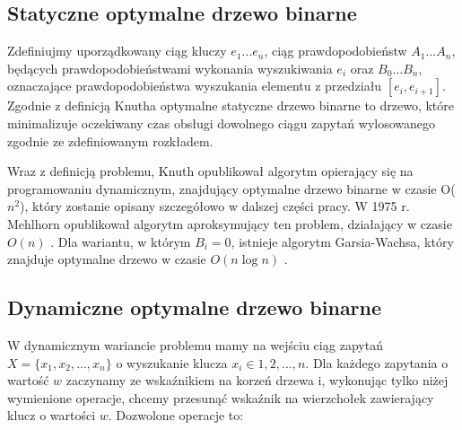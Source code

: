 \documentclass[declaration,shortabstract]{iithesis}
\theoremstyle{thm}
\theoremstyle{remark}
\theoremstyle{plain}
\theoremstyle{plain}
\theoremstyle{plain}
\begin{document}
\subsection{Statyczne optymalne drzewo binarne}   

Zdefiniujmy uporządkowany ciąg kluczy \(e_1...e_n\), ciąg prawdopodobieństw \(A_1...A_n\), będących prawdopodobieństwami wykonania wyszukiwania \(e_i\) oraz \(B_0 … B_n\), oznaczające prawdopodobieństwa wyszukania elementu z przedziału \([e_i, e_{i+1}]\). Zgodnie z definicją Knutha \cite{DBLP:journals/acta/Knuth71} optymalne statyczne drzewo binarne to drzewo, które minimalizuje oczekiwany czas obsługi dowolnego ciągu zapytań wylosowanego zgodnie ze zdefiniowanym rozkładem.    

Wraz z definicją problemu, Knuth opublikował algorytm opierający się na programowaniu dynamicznym, znajdujący optymalne drzewo binarne w czasie O(\(n^2\)), który zostanie opisany szczegółowo w dalszej części pracy. W 1975 r. Mehlhorn opublikował algorytm aproksymujący ten problem, działający w czasie \(O(n)\) \cite{DBLP:journals/acta/Mehlhorn75}. Dla wariantu, w którym \(B_i = 0\), istnieje algorytm Garsia-Wachsa, który znajduje optymalne drzewo w czasie \(O(n\log n)\) \cite{DBLP:journals/siamcomp/GarsiaW77}.   

\subsection{Dynamiczne optymalne drzewo binarne}   

W dynamicznym wariancie problemu \cite{DBLP:journals/siamcomp/DemaineHIP07} mamy na wejściu ciąg zapytań \(X  = \{x_1,x_2,..., x_n\}\) o wyszukanie klucza \(x_i \in {1, 2, ..., n}\). Dla każdego zapytania o wartość \(w\) zaczynamy ze wskaźnikiem na korzeń drzewa i, wykonując tylko niżej wymienione operacje, chcemy przesunąć wskaźnik na wierzchołek zawierający klucz o wartości \(w\). Dozwolone operacje to:   
\end{document}
